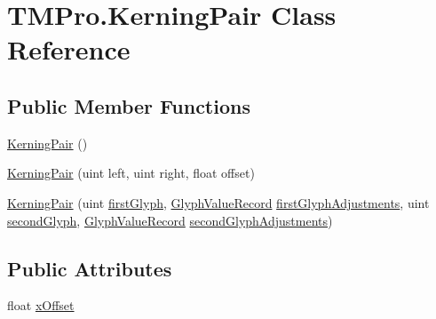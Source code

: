 \hypertarget{class_t_m_pro_1_1_kerning_pair}{}\section{T\+M\+Pro.\+Kerning\+Pair Class Reference}
\label{class_t_m_pro_1_1_kerning_pair}
\subsection*{Public Member Functions}
\begin{DoxyCompactItemize}
\item 
\mbox{\hyperlink{class_t_m_pro_1_1_kerning_pair_a032626cb5e1418985149eecc02e321ff}{Kerning\+Pair}} ()
\item 
\mbox{\hyperlink{class_t_m_pro_1_1_kerning_pair_a180b8ff824757b096d9ad32dd4655919}{Kerning\+Pair}} (uint left, uint right, float offset)
\item 
\mbox{\hyperlink{class_t_m_pro_1_1_kerning_pair_aae1c4176e2099f2cb8ff1c6fb093e2bb}{Kerning\+Pair}} (uint \mbox{\hyperlink{class_t_m_pro_1_1_kerning_pair_af9aa2a18d3992d1fa6080e44c69fe7c5}{first\+Glyph}}, \mbox{\hyperlink{struct_t_m_pro_1_1_glyph_value_record}{Glyph\+Value\+Record}} \mbox{\hyperlink{class_t_m_pro_1_1_kerning_pair_a5eed997a7f25917e7de7804a6cf052f4}{first\+Glyph\+Adjustments}}, uint \mbox{\hyperlink{class_t_m_pro_1_1_kerning_pair_a65feda26da1fd1a3fcdb1aa4ca681612}{second\+Glyph}}, \mbox{\hyperlink{struct_t_m_pro_1_1_glyph_value_record}{Glyph\+Value\+Record}} \mbox{\hyperlink{class_t_m_pro_1_1_kerning_pair_a04339cd46e942ce4841397cb801c47d7}{second\+Glyph\+Adjustments}})
\end{DoxyCompactItemize}
\subsection*{Public Attributes}
\begin{DoxyCompactItemize}
\item 
float \mbox{\hyperlink{class_t_m_pro_1_1_kerning_pair_ab6e227878e0f55e26103c94914384617}{x\+Offset}}
\end{DoxyCompactItemize}
